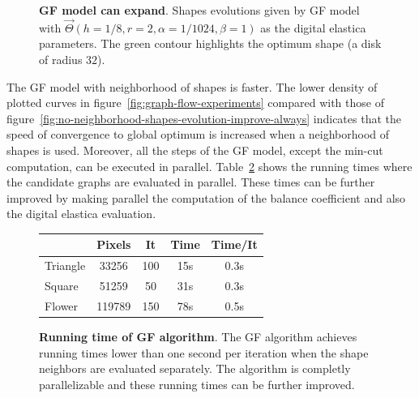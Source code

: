 \documentclass[smallextended]{svjour3}
\begin{document}
\begin{figure}
\caption{\textbf{GF model can expand}. Shapes evolutions given by GF model with $\vec{\Theta}(h=1/8,r=2,\alpha=1/1024, \beta=1)$ as the digital elastica parameters. The green contour highlights the optimum shape (a disk of radius $32$).}
\label{fig:graph-flow-expand}
\end{figure}

The GF model with neighborhood of shapes is faster. The lower density of plotted curves in figure~\ref{fig:graph-flow-experiments} compared with those of figure~\ref{fig:no-neighborhood-shapes-evolution-improve-always} indicates that the speed of convergence to global optimum is increased when a neighborhood of shapes is used. Moreover,  all the steps of the GF model, except the min-cut computation, can be executed in parallel. Table~\ref{tab:summary-graph-flow-running-time} shows the running times where the candidate graphs are evaluated in parallel. These times can be further improved by making parallel the computation of the balance coefficient and also the digital elastica evaluation.

\begin{figure}[h!]
\center
\captionsetup{type=table}
\footnotesize
\begin{tabular}{|l|c|c|c|c|}
\hline
& Pixels & It & Time & Time/It\\
\hline
Triangle & 33256 & 100 & 15s & 0.3s \\
Square & 51259 & 50 & 31s & 0.3s \\
Flower & 119789 & 150 & 78s & 0.5s \\
\hline
\end{tabular}
\caption{\textbf{Running time of GF algorithm}. The GF algorithm achieves running times lower than one second per iteration when the shape neighbors are evaluated separately. The algorithm is completly parallelizable and these running times can be further improved.}
\label{tab:summary-graph-flow-running-time} 
\end{figure}
\end{document}
